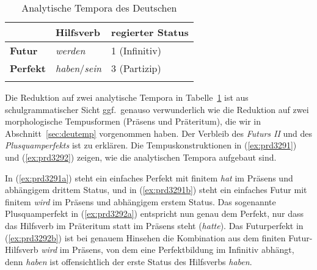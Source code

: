 
\begin{table}[!htbp]
  \centering
  \begin{tabular}{lll}
    \lsptoprule
    & \textbf{Hilfsverb} & \textbf{regierter Status} \\
    \midrule
    \textbf{Futur} & \textit{werden} & 1 (Infinitiv) \\
    \textbf{Perfekt} & \textit{haben}\slash\textit{sein} & 3 (Partizip) \\
    \lspbottomrule
  \end{tabular}
  \caption{Analytische Tempora des Deutschen}
  \label{tab:anatemp}
\end{table}

Die Reduktion auf zwei analytische Tempora in Tabelle~\ref{tab:anatemp} ist aus schulgrammatischer Sicht ggf.\ genauso verwunderlich wie die Reduktion auf zwei morphologische Tempusformen (Präsens und Präteritum), die wir in Abschnitt~\ref{sec:deutemp} vorgenommen haben.
Der Verbleib des \textit{Futurs II} und des \textit{Plusquamperfekts} ist zu erklären.
Die Tempuskonstruktionen in (\ref{ex:prd3291}) und (\ref{ex:prd3292}) zeigen, wie die analytischen Tempora aufgebaut sind.

\begin{exe}
  \ex\label{ex:prd3291} 
  \begin{xlist}
  \end{xlist}
  \ex\label{ex:prd3292} 
  \begin{xlist}
  \end{xlist}
\end{exe}

In (\ref{ex:prd3291a}) steht ein einfaches Perfekt mit finitem \textit{hat} im Präsens und abhängigem drittem Status, und in (\ref{ex:prd3291b}) steht ein einfaches Futur mit finitem \textit{wird} im Präsens und abhängigem erstem Status.
Das sogenannte Plusquamperfekt in (\ref{ex:prd3292a}) entspricht nun genau dem Perfekt, nur dass das Hilfsverb im Präteritum statt im Präsens steht (\textit{hatte}).
Das Futurperfekt in (\ref{ex:prd3292b}) ist bei genauem Hinsehen die Kombination aus dem finiten Futur-Hilfsverb \textit{wird} im Präsens, von dem eine Perfektbildung im Infinitiv abhängt, denn \textit{haben} ist offensichtlich der erste Status des Hilfsverbs \textit{haben}.

